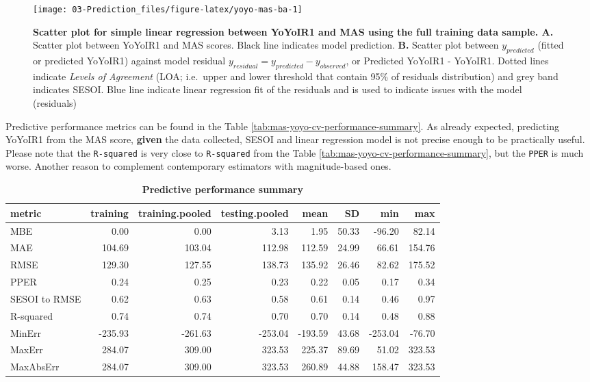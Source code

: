 \documentclass[
]{book}
\begin{document}
\begin{figure}

{\centering \texttt{[image: 03-Prediction\_files/figure-latex/yoyo-mas-ba-1]} 

}

\caption{\textbf{Scatter plot for simple linear regression between YoYoIR1 and MAS using the full training data sample. A. } Scatter plot between YoYoIR1 and MAS scores. Black line indicates model prediction. \textbf{B.} Scatter plot between \(y_{predicted}\) (fitted or predicted YoYoIR1) against model residual \(y_{residual} = y_{predicted} - y_{observed}\), or Predicted YoYoIR1 - YoYoIR1. Dotted lines indicate \emph{Levels of Agreement} (LOA; i.e.~upper and lower threshold that contain 95\% of residuals distribution) and grey band indicates SESOI. Blue line indicate linear regression fit of the residuals and is used to indicate issues with the model (residuals)}\label{fig:yoyo-mas-ba}
\end{figure}



Predictive performance metrics can be found in the Table \ref{tab:mas-yoyo-cv-performance-summary}. As already expected, predicting YoYoIR1 from the MAS score, \textbf{given} the data collected, SESOI and linear regression model is not precise enough to be practically useful. Please note that the \texttt{R-squared} is very close to \texttt{R-squared} from the Table \ref{tab:mas-yoyo-cv-performance-summary}, but the \texttt{PPER} is much worse. Another reason to complement contemporary estimators with magnitude-based ones.



\begin{table}

\caption{\label{tab:yoyo-mas-cv-performance-summary}\textbf{Predictive performance summary}}
\centering
\begin{tabular}[t]{lrrrrrrr}
\toprule
metric & training & training.pooled & testing.pooled & mean & SD & min & max\\
\midrule
MBE & 0.00 & 0.00 & 3.13 & 1.95 & 50.33 & -96.20 & 82.14\\
MAE & 104.69 & 103.04 & 112.98 & 112.59 & 24.99 & 66.61 & 154.76\\
RMSE & 129.30 & 127.55 & 138.73 & 135.92 & 26.46 & 82.62 & 175.52\\
PPER & 0.24 & 0.25 & 0.23 & 0.22 & 0.05 & 0.17 & 0.34\\
SESOI to RMSE & 0.62 & 0.63 & 0.58 & 0.61 & 0.14 & 0.46 & 0.97\\
\addlinespace
R-squared & 0.74 & 0.74 & 0.70 & 0.70 & 0.14 & 0.48 & 0.88\\
MinErr & -235.93 & -261.63 & -253.04 & -193.59 & 43.68 & -253.04 & -76.70\\
MaxErr & 284.07 & 309.00 & 323.53 & 225.37 & 89.69 & 51.02 & 323.53\\
MaxAbsErr & 284.07 & 309.00 & 323.53 & 260.89 & 44.88 & 158.47 & 323.53\\
\bottomrule
\end{tabular}
\end{table}
\end{document}

